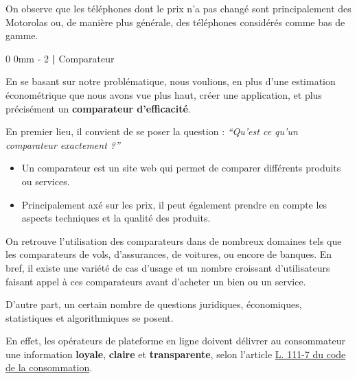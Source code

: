 \documentclass[
  12pt,
]{report}
\makeatletter
\renewcommand{\chapter}{%
    \clearpage %
    \@startsection{chapter}%
    {0} %
    {0mm} %
    {-\baselineskip} %
    {2\baselineskip} %
    {\normalfont\Huge\bfseries | \Huge\bfseries}%
}
\makeatother
\begin{document}
On observe que les téléphones dont le prix n'a pas changé sont
principalement des Motorolas ou, de manière plus générale, des
téléphones considérés comme bas de gamme.

\chapter{Comparateur}\label{comparateur}

En se basant sur notre problématique, nous voulions, en plus d'une
estimation économétrique que nous avons vue plus haut, créer une
application, et plus précisément un \textbf{comparateur d'efficacité}.

En premier lieu, il convient de se poser la question : \emph{``Qu'est ce
qu'un comparateur exactement ?''}

\begin{tcolorbox}[enhanced jigsaw, left=2mm, coltitle=black, colback=white, colframe=quarto-callout-tip-color-frame, bottomtitle=1mm, opacitybacktitle=0.6, title=\textcolor{quarto-callout-tip-color}{\faLightbulb}\hspace{0.5em}{Définition}, rightrule=.15mm, toprule=.15mm, breakable, opacityback=0, colbacktitle=quarto-callout-tip-color!10!white, toptitle=1mm, titlerule=0mm, arc=.35mm, bottomrule=.15mm, leftrule=.75mm]

\begin{itemize}
\item
  Un comparateur est un site web qui permet de comparer différents
  produits ou services.
\item
  Principalement axé sur les prix, il peut également prendre en compte
  les aspects techniques et la qualité des produits.
\end{itemize}

\end{tcolorbox}

On retrouve l'utilisation des comparateurs dans de nombreux domaines
tels que les comparateurs de vols, d'assurances, de voitures, ou encore
de banques. En bref, il existe une variété de cas d'usage et un nombre
croissant d'utilisateurs faisant appel à ces comparateurs avant
d'acheter un bien ou un service.

D'autre part, un certain nombre de questions juridiques, économiques,
statistiques et algorithmiques se posent.

En effet, les opérateurs de plateforme en ligne doivent délivrer au
consommateur une information \textbf{loyale}, \textbf{claire} et
\textbf{transparente}, selon l'article
\href{https://www.legifrance.gouv.fr/codes/article_lc/LEGIARTI000033219601}{L.
111-7 du code de la consommation}.
\end{document}
